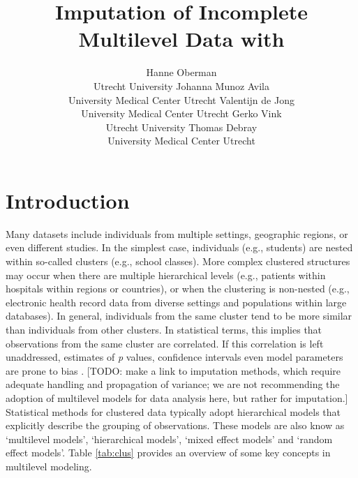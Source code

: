 \documentclass[
]{jss}
\author{
Hanne Oberman\\Utrecht University \And Johanna Munoz Avila\\University
Medical Center Utrecht \AND Valentijn de Jong\\University Medical
Center Utrecht \And Gerko Vink\\Utrecht University \AND Thomas
Debray\\University Medical Center Utrecht
}
\title{Imputation of Incomplete Multilevel Data with \pkg{mice}}
\begin{document}
\hypertarget{introduction}{%
\section{Introduction}\label{introduction}}

Many datasets include individuals from multiple settings, geographic
regions, or even different studies. In the simplest case, individuals
(e.g., students) are nested within so-called clusters (e.g., school
classes). More complex clustered structures may occur when there are
multiple hierarchical levels (e.g., patients within hospitals within
regions or countries), or when the clustering is non-nested (e.g.,
electronic health record data from diverse settings and populations
within large databases). In general, individuals from the same cluster
tend to be more similar than individuals from other clusters. In
statistical terms, this implies that observations from the same cluster
are correlated. If this correlation is left unaddressed, estimates of
\emph{p} values, confidence intervals even model parameters are prone to
bias \citep{loca01}. {[}TODO: make a link to imputation methods, which
require adequate handling and propagation of variance; we are not
recommending the adoption of multilevel models for data analysis here,
but rather for imputation.{]} Statistical methods for clustered data
typically adopt hierarchical models that explicitly describe the
grouping of observations. These models are also know as `multilevel
models', `hierarchical models', `mixed effect models' and `random effect
models'. Table \ref{tab:clus} provides an overview of some key concepts
in multilevel modeling.
\end{document}
